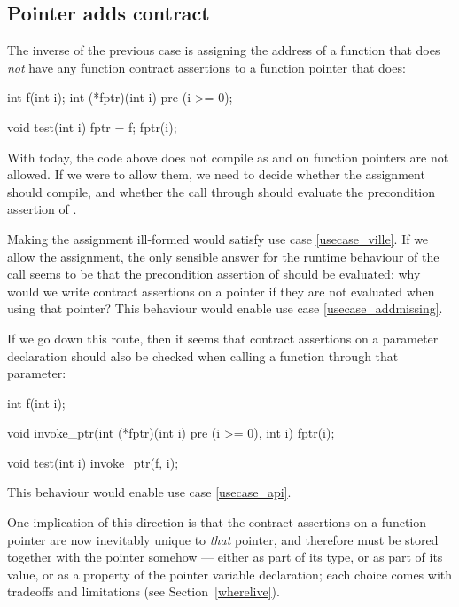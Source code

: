
\subsection{Pointer adds contract}
\label{adding}

The inverse of the previous case is assigning the address of a function that does \emph{not} have any function contract assertions to a function pointer that does:
\begin{codeblock}
int f(int i);
int (*fptr)(int i)  pre (i >= 0);

void test(int i) {
  fptr = f;
  fptr(i); 
}
\end{codeblock}
With \cite{P2900R8} today, the code above does not compile as  and  on function pointers are not allowed. If we were to allow them, we need to decide whether the assignment should compile, and whether the call through  should evaluate the precondition assertion of .

Making the assignment ill-formed would satisfy use case \ref{usecase_ville}. If we allow the assignment, the only sensible answer for the runtime behaviour of the call seems to be that the precondition assertion of  should be evaluated: why would we write contract assertions on a pointer if they are not evaluated when using that pointer? This behaviour would enable use case \ref{usecase_addmissing}.

If we go down this route, then it seems that contract assertions on a parameter declaration should also be checked when calling a function through that parameter:
\begin{codeblock}
int f(int i);

void invoke_ptr(int (*fptr)(int i) pre (i >= 0), int i) {
  fptr(i);
}

void test(int i) {
  invoke_ptr(f, i);
}
\end{codeblock}
This behaviour would enable use case \ref{usecase_api}.

One implication of this direction is that the contract assertions on a function pointer are now inevitably unique to \emph{that} pointer, and therefore must be stored together with the pointer somehow --- either as part of its type, or as part of its value, or as a property of the pointer variable declaration; each choice comes with  tradeoffs and limitations (see Section~\ref{wherelive}).
 
